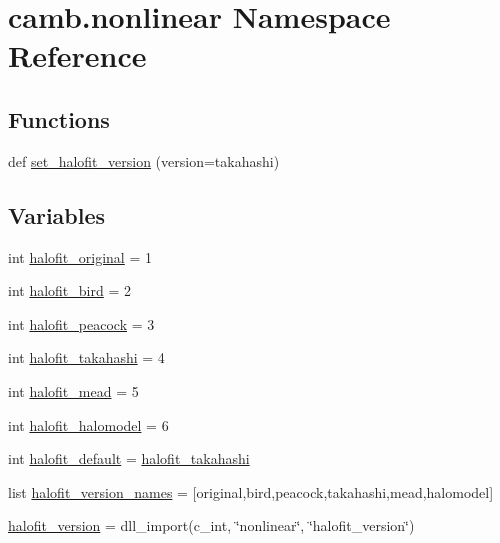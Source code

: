 \hypertarget{namespacecamb_1_1nonlinear}{}\section{camb.\+nonlinear Namespace Reference}
\label{namespacecamb_1_1nonlinear}
\subsection*{Functions}
\begin{DoxyCompactItemize}
\item 
def \mbox{\hyperlink{namespacecamb_1_1nonlinear_a01c70f88079f6593becfaa39b9fa3d2c}{set\+\_\+halofit\+\_\+version}} (version=\textquotesingle{}takahashi\textquotesingle{})
\end{DoxyCompactItemize}
\subsection*{Variables}
\begin{DoxyCompactItemize}
\item 
int \mbox{\hyperlink{namespacecamb_1_1nonlinear_add5cb4eef86db35a9dd044f8f7583e7c}{halofit\+\_\+original}} = 1
\item 
int \mbox{\hyperlink{namespacecamb_1_1nonlinear_a2334ce8801e74e3271d92ea01c502564}{halofit\+\_\+bird}} = 2
\item 
int \mbox{\hyperlink{namespacecamb_1_1nonlinear_a8a2a9f465a40de072eee78895e0d0ea7}{halofit\+\_\+peacock}} = 3
\item 
int \mbox{\hyperlink{namespacecamb_1_1nonlinear_aabecfdf5ffd763f58d00601ebda0d3d0}{halofit\+\_\+takahashi}} = 4
\item 
int \mbox{\hyperlink{namespacecamb_1_1nonlinear_a970f6a994d0dc13d1ebfd75e20802d6a}{halofit\+\_\+mead}} = 5
\item 
int \mbox{\hyperlink{namespacecamb_1_1nonlinear_a16f424b9e69ffd29393e0f21a5e20b0a}{halofit\+\_\+halomodel}} = 6
\item 
int \mbox{\hyperlink{namespacecamb_1_1nonlinear_acfdc19f5878b8dcd233f6896036cba90}{halofit\+\_\+default}} = \mbox{\hyperlink{namespacecamb_1_1nonlinear_aabecfdf5ffd763f58d00601ebda0d3d0}{halofit\+\_\+takahashi}}
\item 
list \mbox{\hyperlink{namespacecamb_1_1nonlinear_a0941c8d4929245eb7b62e91f3f9d4aa3}{halofit\+\_\+version\+\_\+names}} = \mbox{[}\textquotesingle{}original\textquotesingle{},\textquotesingle{}bird\textquotesingle{},\textquotesingle{}peacock\textquotesingle{},\textquotesingle{}takahashi\textquotesingle{},\textquotesingle{}mead\textquotesingle{},\textquotesingle{}halomodel\textquotesingle{}\mbox{]}
\item 
\mbox{\hyperlink{namespacecamb_1_1nonlinear_a6058a71f13b19de2854bebc0486b900c}{halofit\+\_\+version}} = dll\+\_\+import(c\+\_\+int, \char`\"{}nonlinear\char`\"{}, \char`\"{}halofit\+\_\+version\char`\"{})
\end{DoxyCompactItemize}


